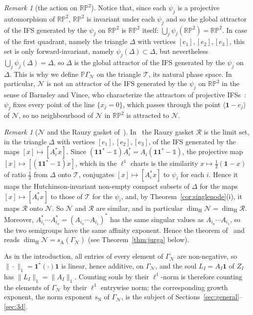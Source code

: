 \documentclass[11pt]{amsart}
\newcommand{\id}{\mathds{1}}
\theoremstyle{definition}
\theoremstyle{remark}
\newtheorem{remark}[proposition]{Remark}
\newcommand{\one}{\mathbf 1}
\newcommand{\RP}{\mathbb{RP}}
\newcommand{\cN}{\mathcal N}
\newcommand{\cT}{\mathcal T}
\newcommand{\GN}{\Gamma_{\mathcal N}}
\newcommand{\PGN}{{\mathbb P}\Gamma_{\mathcal N}}
\newcommand{\sN}{s_{\mathrm N}}
\newcommand{\sA}{s_{\mathrm A}}
\newcommand{\dimH}{\dim_{\mathrm H}}
\newcommand{\norm}[1]{\lVert #1\rVert}
\newcommand{\pr}[1]{\langle #1\rangle}
\begin{document}
\begin{remark}[the action on $\RP^2$]\label{rem:RP2}
Notice that, since each $\psi_j$ is a projective automorphism of $\RP^2$, $\RP^2$ is invariant under each $\psi_j$ and so the global attractor of the IFS generated by the $\psi_j$ on $\RP^2$ is $\RP^2$ itself: $\bigcup_j\psi_j(\RP^2)=\RP^2$.
In case of the first quadrant, namely the triangle $\Delta$ with vertices $[e_1],[e_2],[e_3]$, this set is only forward-invariant, namely $\psi_j(\Delta)\subset\Delta$, but nevertheless $\bigcup_j\psi_j(\Delta)=\Delta$, so $\Delta$ is the global attractor of the IFS generated by the $\psi_j$ on $\Delta$. 
This is why we define $\PGN$ on the triangle $\cT$, its natural phase space. In particular, $\cN$ is not an attractor of the IFS generated by the $\psi_j$ on $\RP^2$ in the sense of Barnsley and Vince, who characterize the attractors of projective IFSs~\cite{BV12}: $\psi_j$ fixes every point of the line $\{x_j=0\}$, which passes through the point $\pr{\one-e_j}$ of $\cN$, so no neighbourhood of $\cN$ in $\RP^2$ is attracted to $\cN$.
\end{remark}

\begin{remark}[$\cN$ and the Rauzy gasket of~\cite{JLPX23,Jur26}]
\label{rem:conj}
In~\cite{AS13,JLPX23,Jur26} the Rauzy gasket $\mathcal R$ is the limit set, in the triangle $\Delta$ with vertices $[e_1],[e_2],[e_3]$, of the IFS generated by the maps $[x]\mapsto[A_i^*x]$. 
Since $(\one\one^*-\id)A_i^*=A_i(\one\one^*-\id)$, the projective map $[x]\mapsto[(\one\one^*-\id)x]$, which in the $\ell^1$ charts is the similarity $x\mapsto\frac12(\one-x)$ of ratio $\frac12$ from $\Delta$ onto $\cT$, conjugates $[x]\mapsto[A_i^*x]$ to $\psi_i$ for each $i$. Hence it maps the Hutchinson-invariant non-empty compact subsets of $\Delta$ for the maps $[x]\mapsto[A_i^*x]$ to those of $\cT$ for the $\psi_i$, and, by Theorem~\ref{cor:singlenode}(i), it maps $\mathcal R$ onto $\cN$. So $\cN$ and $\mathcal R$ are similar, and in particular $\dimH\cN=\dimH\mathcal R$.
Moreover, $A^*_{i_1}\cdots A^*_{i_n}=(A_{i_n}\cdots A_{i_1})^*$ has the same singular
values as $A_{i_n}\cdots A_{i_1}$, so the two semigroups have the same affinity exponent.
Hence the theorem of~\cite{JLPX23,LPX23} and~\cite{Jur26} reads $\dimH\cN=\sA(\GN)$ (see Theorem~\ref{thm:jurga} below).
\end{remark}

As in the introduction, all entries of every element of $\GN$ are non-negative, so $\|\cdot\|_1=\one^*(\cdot)\one$ is linear, hence additive, on $\GN$, and the soul $L_I=A_I\one$ of $Z_I$ has $\norm{L_I}_1=\norm{A_I}_1$. Counting souls by their $\ell^1$-norm is therefore counting the elements of $\GN$ by their $\ell^1$ entrywise norm; the corresponding growth exponent, the norm exponent $\sN$ of $\GN$, is the subject of Sections~\ref{sec:general}--\ref{sec:3d}.
\end{document}
